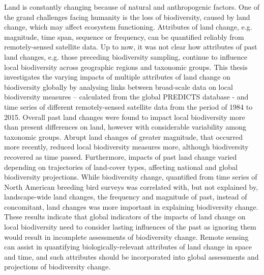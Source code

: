     \noindent  \small Land is constantly changing because of natural and anthropogenic factors. One of the grand challenges facing humanity is the loss of biodiversity, caused by land change, which may affect ecosystem functioning. Attributes of land change, e.g. magnitude, time span, sequence or frequency, can be quantified reliably from remotely-sensed satellite data. Up to now, it was not clear how attributes of past land changes, e.g. those preceding biodiversity sampling, continue to influence local biodiversity across geographic regions and taxonomic groups. This thesis investigates the varying impacts of multiple attributes of land change on biodiversity globally by analysing links between broad-scale data on local biodiversity measures – calculated from the global PREDICTS database - and time series of different remotely-sensed satellite data from the period of 1984 to 2015. Overall past land changes were found to impact local  biodiversity more than present differences on land, however with considerable variability among taxonomic groups. Abrupt land changes of greater magnitude, that occurred more recently, reduced local biodiversity measures more, although biodiversity recovered as time passed. Furthermore, impacts of past land change varied depending on trajectories of land-cover types, affecting national and global biodiversity projections. While biodiversity change, quantified from time series of North American breeding bird surveys was correlated with, but not explained by, landscape-wide land changes, the frequency and magnitude of past, instead of concomitant, land changes was more important in explaining biodiversity change. These results indicate that global indicators of the impacts of land change on local biodiversity need to consider lasting influences of the past as ignoring them would result in incomplete assessments of biodiversity change. Remote sensing can assist in quantifying biologically-relevant attributes of land change in space and time, and such attributes should be incorporated into global assessments and projections of biodiversity change.

